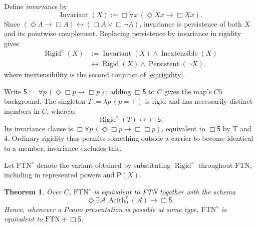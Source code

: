 \documentclass[11pt,letterpaper,numbers=noenddot]{scrartcl}
\numberwithin{equation}{section}
\newtheorem{theorem}{Theorem}[section]
\theoremstyle{definition}
\newcommand{\Rigid}{\operatorname{Rigid}}
\newcommand{\Arith}{\operatorname{Arith}}
\newcommand{\PP}{\mathsf P}
\newcommand{\FTN}{\mathrm{FTN}}
\begin{document}
Define \emph{invariance} by
\begin{equation}\label{eq:invariance}
\operatorname{Invariant}(X):=
\Box\forall x\,(\Diamond Xx\to\Box Xx).
\end{equation}
Since $(\Diamond A\to\Box A)\leftrightarrow(\Box A\lor\Box\neg A)$, invariance is persistence of both $X$ and its pointwise complement. Replacing persistence by invariance in rigidity gives
\begin{equation}\label{eq:invariant-rigidity}
\begin{split}
\Rigid^\diamond(X)
&:=\operatorname{Invariant}(X)\land\operatorname{Inextensible}(X)\\
&\longleftrightarrow
\Rigid(X)\land\operatorname{Persistent}(\neg X),
\end{split}
\end{equation}
where inextensibility is the second conjunct of \eqref{eq:rigidity}.

Write $\mathsf 5:=\forall p\,(\Diamond\Box p\to\Box p)$; adding $\Box\mathsf 5$ to $C$ gives the map's $C5$ background. The singleton $T:=\lambda p\,(p=\top)$ is rigid and has necessarily distinct members in $C$, whereas
\begin{equation}\label{eq:invariant-singleton}
\Rigid^\diamond(T)\longleftrightarrow\Box\mathsf 5.
\end{equation}
Its invariance clause is $\Box\forall p\,(\Diamond\Box p\to\Box\Box p)$, equivalent to $\Box\mathsf 5$ by T and 4. Ordinary rigidity thus permits something outside a carrier to become identical to a member; invariance excludes this.

Let $\FTN^\diamond$ denote the variant obtained by substituting $\Rigid^\diamond$ throughout FTN, including in represented powers and $\PP(X)$.

\begin{theorem}\label{thm:invariant-ftn}
Over $C$, $\FTN^\diamond$ is equivalent to FTN together with the schema
\begin{equation}\label{eq:invariant-ftn-guard}
\Diamond\exists\mathcal A\,\Arith_0^\tau(\mathcal A)
\longrightarrow\Box\mathsf 5.
\end{equation}
Hence, whenever a Peano presentation is possible at some type,
$\FTN^\diamond$ is equivalent to $\FTN+\Box\mathsf 5$.
\end{theorem}
\end{document}
